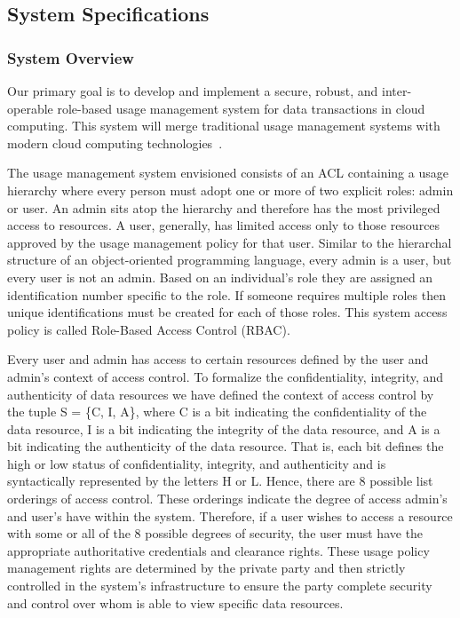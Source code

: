 \documentclass{sig-alternate}
\begin{document}
\subsection{System Specifications}
\subsubsection{System Overview}
Our primary goal is to develop and implement a secure, robust, and inter-operable role-based usage management system for data transactions in cloud computing. This system will merge traditional usage management systems with modern cloud computing technologies~\cite{Jamkhedkar:2010:IUM:1866870.1866885}.

The usage management system envisioned consists of an ACL containing a usage hierarchy where every person must adopt one or more of two explicit roles: admin or user. An admin sits atop the hierarchy and therefore has the most privileged access to resources. A user, generally, has limited access only to those resources approved by the usage management policy for that user. Similar to the hierarchal structure of an object-oriented programming language, every admin is a user, but every user is not an admin. Based on an individual's role they are assigned an identification number specific to the role. If someone requires multiple roles then unique identifications must be created for each of those roles. This system access policy is called Role-Based Access Control (RBAC). 

Every user and admin has access to certain resources defined by the user and admin's context of access control.  To formalize the confidentiality, integrity, and authenticity of data resources we have defined the context of access control by the tuple S = \{C, I, A\}, where C is a bit indicating the confidentiality of the data resource, I is a bit indicating the integrity of the data resource, and A is a bit indicating the authenticity of the data resource. That is, each bit defines the high or low status of confidentiality, integrity, and authenticity and is syntactically represented by the letters H or L.  Hence, there are 8 possible list orderings of access control.  These orderings indicate the degree of access admin's and user's have within the system. Therefore, if a user wishes to access a resource with some or all of the 8 possible degrees of security, the user must have the appropriate authoritative credentials and clearance rights.  These usage policy management rights are determined by the private party and then strictly controlled in the system's infrastructure to ensure the party complete security and control over whom is able to view specific data resources.
\end{document}
